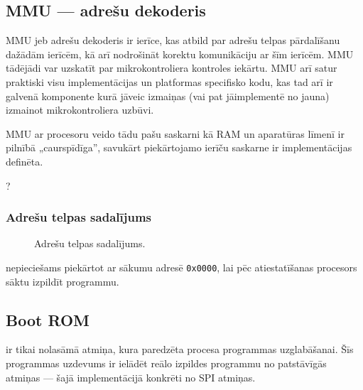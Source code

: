 

\subsection{MMU — adrešu dekoderis} \label{sec:mmu}
	MMU jeb adrešu dekoderis ir ierīce, kas atbild par adrešu telpas
	pārdalīšanu dažādām ierīcēm, kā arī nodrošināt korektu komunikāciju
	ar šīm ierīcēm. MMU tādējādi var uzskatīt par mikrokontroliera kontroles
	iekārtu. MMU arī satur praktiski visu implementācijas un platformas
	specifisko kodu, kas tad arī ir galvenā komponente kurā jāveic izmaiņas
	(vai pat jāimplementē no jauna) izmainot mikrokontroliera uzbūvi.
	
	MMU ar procesoru veido tādu pašu saskarni kā RAM un aparatūras
	līmenī ir pilnībā „caurspīdīga”, savukārt piekārtojamo ierīču saskarne
	ir implementācijas definēta.
	
	\todo ?
	
	\subsubsection{Adrešu telpas sadalījums}
	\begin{figure}[thp]
		\centering
		\def\svgwidth{0.9\textwidth}
		{\ttfamily\small}
		\caption{Adrešu telpas sadalījums.}
		\label{fig:memory-map}
	\end{figure}
	
	 nepieciešams piekārtot ar sākumu adresē \texttt{0x0000},
	lai pēc atiestatīšanas procesors sāktu izpildīt  programmu.


\subsection{Boot ROM}
	 ir tikai nolasāmā atmiņa, kura paredzēta
	 procesa programmas uzglabāšanai.
	Šīs programmas uzdevums ir ielādēt reālo izpildes programmu no
	patstāvīgās atmiņas — šajā implementācijā konkrēti 
	no SPI  atmiņas.
	
